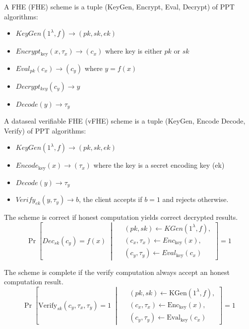 

\begin{definition}[FHE]
A FHE (FHE) scheme is a tuple (KeyGen, Encrypt, Eval, Decrypt) of PPT algorithms:
\begin{itemize}
    \item $KeyGen(1^\lambda,f) \rightarrow (pk,sk, ek)$
    \item $Encrypt_{\text{key}}(x, \tau_x) \rightarrow (c_x)$ where key is either $pk$ or $sk$
    \item $Eval_{pk}(c_x) \rightarrow (c_y)$ where $y = f(x)$
    \item $Decrypt_{key}(c_y) \rightarrow y$
    \item $Decode(y) \rightarrow \tau_y$
\end{itemize}
\end{definition}

\begin{definition}
A dataseal verifiable FHE (vFHE) scheme is a tuple (KeyGen, Encode Decode, Verify) of PPT algorithms:
\begin{itemize}
    \item $KeyGen(1^\lambda,f) \rightarrow (pk,sk, ek)$
    \item $Encode_{\text{key}}(x) \rightarrow (\tau_x)$ where the key is a secret encoding key (ek)
    \item $Decode(y) \rightarrow \tau_y$
    \item $Verify_{ek}(y, \tau_y) \rightarrow b$, the client accepts if $b = 1$ and rejects otherwise.
\end{itemize}
\end{definition}

\begin{definition}[Correctness]
The scheme is correct if honest computation yields correct decrypted results.
\begin{equation}
    \Pr\left[
    Dec_{sk}(c_y) = f(x)
    \;\middle|\;
    \begin{aligned}
        &(pk, sk) \leftarrow KGen(1^\lambda,f), \\
        &(c_x, \tau_x) \leftarrow Enc_{\text{key}}(x), \\
        &(c_y, \tau_y) \leftarrow Eval_{\text{key}}(c_x)
    \end{aligned}
    \right] = 1
\end{equation}
\end{definition}

\begin{definition}[Completeness]
The scheme is complete if the verify computation always accept an honest computation result.
\begin{equation}
    \Pr\left[
    \text{Verify}_{sk}(c_y, \tau_x, \tau_y) = 1
    \;\middle|\;
    \begin{aligned}
        &(pk, sk) \leftarrow \text{KGen}(1^\lambda,f), \\
        &(c_x, \tau_x) \leftarrow \text{Enc}_{\text{key}}(x), \\
        &(c_y, \tau_y) \leftarrow \text{Eval}_{\text{key}}(c_x)
    \end{aligned}
    \right] = 1
\end{equation}
\end{definition}

